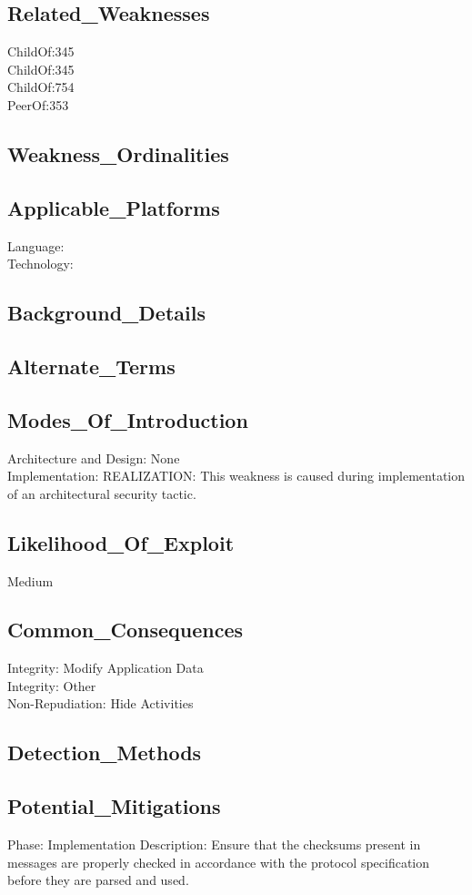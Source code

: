 \subsection*{Related\_Weaknesses}
ChildOf:345\\
ChildOf:345\\
ChildOf:754\\
PeerOf:353\\
\subsection*{Weakness\_Ordinalities}
\subsection*{Applicable\_Platforms}
Language: \\
Technology: \\
\subsection*{Background\_Details}
\subsection*{Alternate\_Terms}
\subsection*{Modes\_Of\_Introduction}
Architecture and Design: None\\
Implementation: REALIZATION: This weakness is caused during implementation of an architectural security tactic.\\
\subsection*{Likelihood\_Of\_Exploit}
Medium

\subsection*{Common\_Consequences}
Integrity: Modify Application Data\\
Integrity: Other\\
Non-Repudiation: Hide Activities\\
\subsection*{Detection\_Methods}
\subsection*{Potential\_Mitigations}
Phase: Implementation
Description: Ensure that the checksums present in messages are properly checked in accordance with the protocol specification before they are parsed and used.\\
